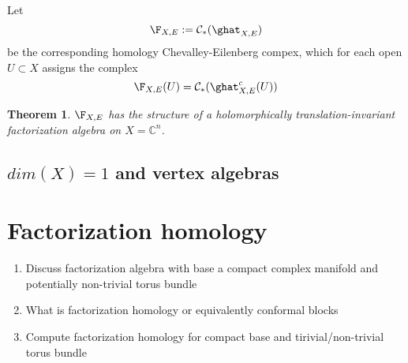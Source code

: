 \documentclass[12pt]{amsart}
\newtheorem{theorem}{Theorem}[section]
\theoremstyle{definition}
\theoremstyle{remark}
\def\brian{\textcolor{blue}{BW: }\textcolor{blue}}
\begin{document}
Let
\begin{equation}
\F_{X,E} := \mathcal{C}_{*} ( \ghat_{X,E} )
\end{equation}
be the corresponding homology Chevalley-Eilenberg compex, which for each open $U \subset X$ assigns the complex
\[
\F_{X,E}(U) = \mathcal{C}_{*} (\ghat^c_{X,E}(U))
\]

\begin{theorem}
$\F_{X,E}$ has the structure of a holomorphically translation-invariant factorization algebra on $X=\mathbb{C}^n$. 
\end{theorem}

\subsection{$dim(X)=1$ and vertex algebras}

\section{Factorization homology}

{\color{red}
\begin{enumerate}
\item Discuss factorization algebra with base a compact complex manifold and potentially non-trivial torus bundle
\item What is factorization homology or equivalently conformal blocks
\item Compute factorization homology for compact base and tirivial/non-trivial torus bundle
\end{enumerate}
}


%  




\address{\tiny DEPARTMENT OF MATHEMATICS AND STATISTICS, BOSTON UNIVERSITY, 111 CUMMINGTON MALL, BOSTON} \\
\indent \footnotesize{}

\address{\tiny DEPARTMENT OF MATHEMATICS, NORTH\brian{WESTERN/EASTERN},...}
\indent \footnotesize{}
\end{document}
